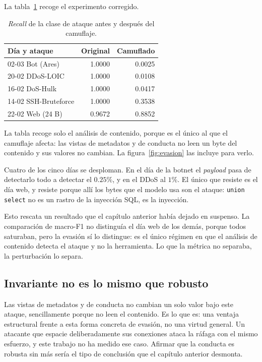 La tabla~\ref{tab:evasion-cap5} recoge el experimento corregido.

\begin{table}[htbp]
  \centering
  \caption[Robustez del payload ante camuflaje de los primeros bytes]{\emph{Recall}
  de la clase de ataque antes y después del camuflaje.}
  \label{tab:evasion-cap5}
  \begin{tabular}{lrr}
    \toprule
    \textbf{Día y ataque} & \textbf{Original} & \textbf{Camuflado} \\
    \midrule
    02-03 Bot (Ares)     & 1.0000 & 0.0025 \\
    20-02 DDoS-LOIC      & 1.0000 & 0.0108 \\
    16-02 DoS-Hulk       & 1.0000 & 0.0417 \\
    14-02 SSH-Bruteforce & 1.0000 & 0.3538 \\
    22-02 Web (24 B)     & 0.9672 & 0.8852 \\
    \bottomrule
  \end{tabular}
\end{table}

La tabla recoge solo el análisis de contenido, porque es el único al que el
camuflaje afecta: las vistas de metadatos y de conducta no leen un byte del
contenido y sus valores no cambian. La figura~\ref{fig:evasion} las incluye para
verlo.

Cuatro de los cinco días se desploman. En el día de la botnet el \emph{payload}
pasa de detectarlo todo a detectar el $0.25\%$, y en el DDoS al $1\%$. El
único que resiste es el día web, y resiste porque allí los bytes que el modelo
usa son el ataque: \texttt{union select} no es un rastro de la inyección SQL, es
la inyección.

Esto rescata un resultado que el capítulo anterior había dejado en suspenso. La
comparación de macro-F1 no distinguía el día web de los demás, porque todos
saturaban, pero la evasión sí lo distingue: es el único régimen en que el
análisis de contenido detecta el ataque y no la herramienta. Lo que la métrica
no separaba, la perturbación lo separa.

\subsection*{Invariante no es lo mismo que robusto}

Las vistas de metadatos y de conducta no cambian un solo valor bajo este ataque,
sencillamente porque no leen el contenido. Es lo que es:
una ventaja estructural frente a esta forma concreta de evasión, no una virtud
general. Un atacante que espacie deliberadamente sus conexiones ataca la ráfaga
con el mismo esfuerzo, y este trabajo no ha medido ese caso. Afirmar que la
conducta es robusta sin más sería el tipo de conclusión que el capítulo anterior
desmonta.


